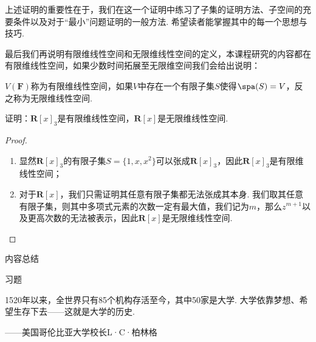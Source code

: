 上述证明的重要性在于，我们在这一个证明中练习了子集的证明方法、子空间的充要条件以及对于``最小''问题证明的一般方法. 希望读者能掌握其中的每一个思想与技巧.

最后我们再说明有限维线性空间和无限维线性空间的定义，本课程研究的内容都在有限维线性空间，如果少数时间拓展至无限维空间我们会给出说明：
\begin{definition}
    $V(\mathbf{F})$称为有限维线性空间，如果$V$中存在一个有限子集$S$使得$\spa(S)=V$，反之称为无限维线性空间.
\end{definition}

\begin{example}
    证明：$\mathbf{R}[x]_3$是有限维线性空间，$\mathbf{R}[x]$是无限维线性空间.
\end{example}

\begin{proof}
    \begin{enumerate}
        \item 显然$\mathbf{R}[x]_3$的有限子集$S=\{1,x,x^2\}$可以张成$\mathbf{R}[x]_3$，因此$\mathbf{R}[x]_3$是有限维线性空间；

        \item 对于$\mathbf{R}[x]$，我们只需证明其任意有限子集都无法张成其本身. 我们取其任意有限子集，则其中多项式元素的次数一定有最大值，我们记为$m$，那么$z^{m+1}$以及更高次数的无法被表示，因此$\mathbf{R}[x]$是无限维线性空间.
    \end{enumerate}
\end{proof}

\vspace{2ex}
\centerline{\heiti \Large 内容总结}

\vspace{2ex}
\centerline{\heiti \Large 习题}

\vspace{2ex}
{\kaishu 1520年以来，全世界只有85个机构存活至今，其中50家是大学. 大学依靠梦想、希望生存下去——这就是大学的历史.}
\begin{flushright}
    \kaishu
    ——美国哥伦比亚大学校长L·C·柏林格
\end{flushright}

